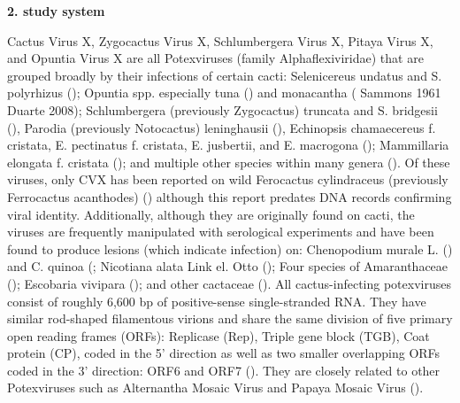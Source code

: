 \documentclass{article}
\begin{document}

\textbf{2. study system}

Cactus Virus X, Zygocactus Virus X, Schlumbergera Virus X, Pitaya Virus X, and Opuntia Virus X are all Potexviruses (family Alphaflexiviridae) that are grouped broadly by their infections of certain cacti: Selenicereus undatus and S. polyrhizus (\cite{li_viral_2015, peng_molecular_2016}); Opuntia spp. especially tuna (\cite{koenig_molecular_2004, duarte_potexvirus_2008}) and monacantha (\cite{attathom_occurrence_1978} Sammons 1961 Duarte 2008); Schlumbergera (previously Zygocactus) truncata and S. bridgesii  (\cite{duarte_potexvirus_2008, koenig_molecular_2004}), Parodia (previously Notocactus) leninghausii (\cite{park_detection_2018}),  Echinopsis chamaecereus f. cristata, E. pectinatus f. cristata, E. jusbertii, and E. macrogona (\cite{maliarenko_cactus_2013}); Mammillaria elongata f. cristata (\cite{maliarenko_cactus_2013}); and multiple other species within many genera (\cite{evallo_brief_2021}). Of these viruses, only CVX has been reported on wild Ferocactus cylindraceus (previously Ferrocactus acanthodes) (\cite{attathom_occurrence_1978}) although this report predates DNA records confirming viral identity. Additionally, although they are originally found on cacti, the viruses are frequently manipulated with serological experiments and have been found to produce lesions (which indicate infection) on: Chenopodium murale L. (\cite{maliarenko_cactus_2013}) and C. quinoa (\cite{attathom_identification_1978,attathom_occurrence_1978, brandes_untersuchungen_1963-1}; Nicotiana alata Link el. Otto (\cite{maliarenko_cactus_2013}); Four species of Amaranthaceae (\cite{attathom_identification_1978}); Escobaria vivipara (\cite{attathom_identification_1978}); and other cactaceae (\cite{attathom_identification_1978}). 
All cactus-infecting potexviruses consist of roughly 6,600 bp of positive-sense single-stranded RNA. They have similar rod-shaped filamentous virions and share the same division of five primary open reading frames (ORFs): Replicase (Rep), Triple gene block (TGB), Coat protein (CP), coded in the 5' direction as well as two smaller overlapping ORFs coded in the 3' direction: ORF6 and ORF7 (\cite{evallo_brief_2021,liou_complete_2004, martelli_family_2007}). They are closely related to other Potexviruses such as Alternantha Mosaic Virus and Papaya Mosaic Virus (\cite{martelli_family_2007, park_detection_2018, liou_complete_2004}). 
\end{document}
